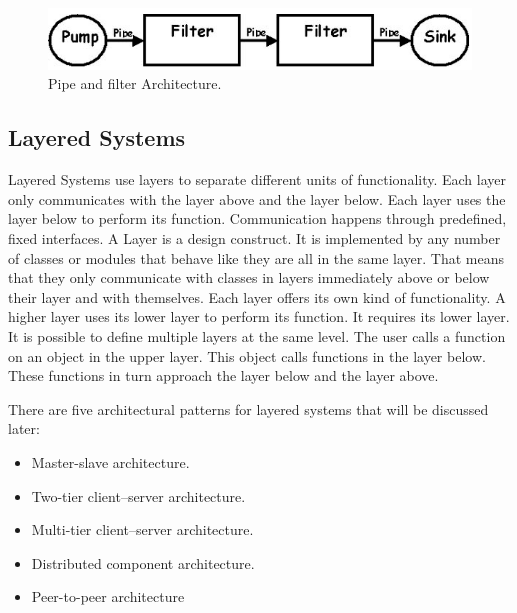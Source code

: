 \documentclass{article}
\begin{document}
\begin{figure}[h]
\centering
\includegraphics[scale=0.65]{p&f.png}
\caption{Pipe and filter Architecture.}
\label{fig_p&f}
\end{figure}


\newpage

\subsection{Layered Systems}
Layered Systems use layers to separate different units of functionality. Each layer only communicates with the layer above and the layer below. Each layer uses the layer below to perform its function. Communication happens through predefined, fixed interfaces. A Layer is a design construct. It is implemented by any number of classes or modules that behave like they are all in the same layer. That means that they only communicate with classes in layers immediately above or below their layer and with themselves. Each layer offers its own kind of functionality. A higher layer uses its lower layer to perform its function. It requires its lower layer. It is possible to define multiple layers at the same level. The user calls a function on an object in the upper layer. This object calls functions in the layer below. These functions in turn approach the layer below and the layer above.

\noindent There are five architectural patterns for layered systems that will be discussed later:
\begin{itemize}

\item Master-slave architecture.
\item Two-tier client–server architecture.
\item Multi-tier client–server architecture.
\item Distributed component architecture.
\item Peer-to-peer architecture

\end{itemize}
\end{document}
